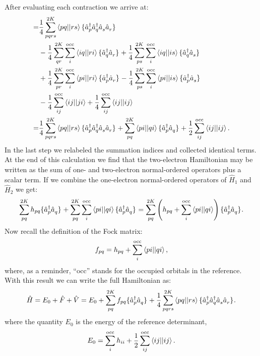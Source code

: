 \documentclass[../Main/chem532-notes.tex]{subfiles}
\begin{document}
After evaluating each contraction we arrive at:
\begin{equation}
\begin{split}
=& \frac{1}{4} \sum_{pqrs}^{2K} \aphystei{pq}{rs} \no{\cop{p}\cop{q}\aop{s}\aop{r}} \\
&-\frac{1}{4} \sum_{qr}^{2K} \sum_{i}^\mathrm{occ} \aphystei{iq}{ri}
\no{\cop{q}\aop{r}}
+\frac{1}{4} \sum_{ps}^{2K} \sum_{i}^\mathrm{occ} \aphystei{iq}{is}
\no{\cop{q}\aop{s}} \\
&+\frac{1}{4} \sum_{pr}^{2K} \sum_{i}^\mathrm{occ} \aphystei{pi}{ri}
\no{\cop{p}\aop{r}}
- 
\frac{1}{4} \sum_{ps}^{2K} \sum_{i}^\mathrm{occ} \aphystei{pi}{is}
\no{\cop{p}\aop{s}} \\
&- \frac{1}{4} \sum_{ij}^\mathrm{occ} \aphystei{ij}{ji}
+ \frac{1}{4} \sum_{ij}^\mathrm{occ} \aphystei{ij}{ij} \\
=& \frac{1}{4} \sum_{pqrs}^{2K} \aphystei{pq}{rs} \no{\cop{p}\cop{q}\aop{s}\aop{r}}
+ \sum_{pq}^{2K} \aphystei{pi}{qi}
\no{\cop{p}\aop{q}}
+ \frac{1}{2} \sum_{ij}^\mathrm{occ} \aphystei{ij}{ij}.
\end{split}
\end{equation}
In the last step we relabeled the summation indices and collected identical terms.
At the end of this calculation we find that the two-electron Hamiltonian may be written as the sum of one- and two-electron normal-ordered operators plus a scalar term.
If we combine the one-electron normal-ordered operators of $\hat{H}_1$ and $\hat{H}_2$ we get:
\begin{equation}
\sum_{pq}^{2K} h_{pq} \{{\hat{a}_{p}^{\dagger} \hat{a}_{q}^{\,}}\}_{}
+ \sum_{pq}^{2K} \sum_{i}^\mathrm{occ}\bra{pi}\!\ket{qi} \{{\hat{a}_{p}^{\dagger}\hat{a}_{q}^{\,}}\}_{}
= \sum_{pq}^{2K} \left( h_{pq} + \sum_{i}^\mathrm{occ}\bra{pi}\!\ket{qi}\right)\{{\hat{a}_{p}^{\dagger}\hat{a}_{q}^{\,}}\}_{}.
\end{equation}
Now recall the definition of the Fock matrix:
\begin{equation}
f_{pq} = h_{pq} + \sum_{i}^\mathrm{occ}\bra{pi}\!\ket{qi},
\end{equation}
where, as a reminder, ``occ'' stands for the occupied orbitals in the reference. 
With this result we can write the full Hamiltonian as:
\begin{equation}
\hat{H} = E_0 + \hat{F} + \hat{V} = E_0 + \sum_{pq}^{2K} f_{pq} \{{\hat{a}_{p}^{\dagger} \hat{a}_{q}^{\,}}\}_{} + 
\frac{1}{4} \sum_{pqrs}^{2K} \bra{pq}\!\ket{rs} \{{\hat{a}_{p}^{\dagger}\hat{a}_{q}^{\dagger}\hat{a}_{s}^{\,}\hat{a}_{r}^{\,}}\}_{}.
\end{equation}
where the quantity $E_0$ is the energy of the reference determinant,
\begin{equation}
E_0 = \sum_{i}^\mathrm{occ} h_{ii} + \frac{1}{2} \sum_{ij}^\mathrm{occ} \bra{ij}\!\ket{ij}.
\end{equation}
\end{document}
